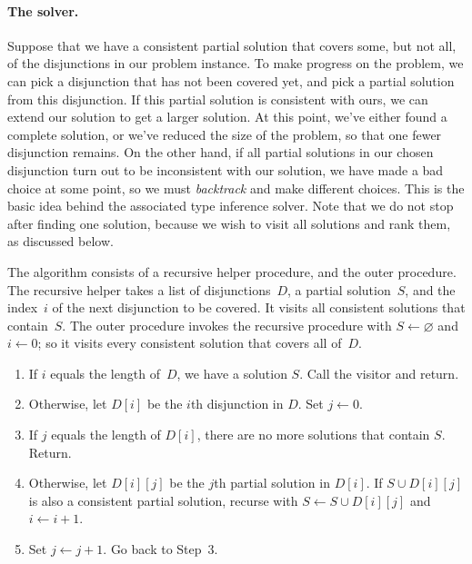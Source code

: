 \documentclass[../generics]{subfiles}
\begin{document}
\paragraph{The solver.}
Suppose that we have a consistent partial solution that covers some, but not all, of the disjunctions in our problem instance. To make progress on the problem, we can pick a disjunction that has not been covered yet, and pick a partial solution from this disjunction. If this partial solution is consistent with ours, we can extend our solution to get a larger solution. At this point, we've either found a complete solution, or we've reduced the size of the problem, so that one fewer disjunction remains. On the other hand, if all partial solutions in our chosen disjunction turn out to be inconsistent with our solution, we have made a bad choice at some point, so we must \emph{backtrack} and make different choices. This is the basic idea behind the associated type inference solver. Note that we do not stop after finding one solution, because we wish to visit all solutions and rank them, as discussed below.

\begin{algorithm}\label{associated type inference algo}
The algorithm consists of a recursive helper procedure, and the outer procedure. The recursive helper takes a list of disjunctions~$D$, a partial solution~$S$, and the index~$i$ of the next disjunction to be covered. It visits all consistent solutions that contain~$S$. The outer procedure invokes the recursive procedure with $S\leftarrow \varnothing$ and $i\leftarrow 0$; so it visits every consistent solution that covers all of~$D$.
\begin{enumerate}
\item If $i$ equals the length of~$D$, we have a solution $S$. Call the visitor and return.
\item Otherwise, let $D[i]$ be the $i$th disjunction in $D$. Set $j\leftarrow 0$.
\item If $j$ equals the length of $D[i]$, there are no more solutions that contain $S$. Return.
\item Otherwise, let $D[i][j]$ be the $j$th partial solution in $D[i]$. If $S \cup D[i][j]$ is also a consistent partial solution, recurse with $S\leftarrow S\cup D[i][j]$ and $i\leftarrow i+1$.
\item Set $j\leftarrow j+1$. Go back to Step~3.
\end{enumerate}
\end{algorithm}
\end{document}
